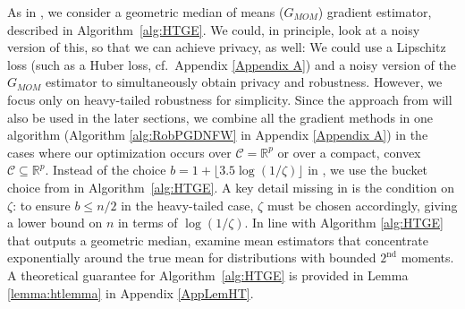\documentclass{article}
\newtheorem{definition}{Definition}[section]
\newcommand{\iid}{i.i.d.{\ }}
\begin{document}



As in \cite{RE}, we consider a geometric median of means ($G_{MOM}$) gradient estimator, described in Algorithm~\ref{alg:HTGE}. We could, in principle, look at a noisy version of this, so that we can achieve privacy, as well:
We could use a Lipschitz loss (such as a Huber loss, cf.\ Appendix \ref{Appendix A}) and a noisy version of the $G_{MOM}$ estimator to simultaneously obtain privacy and robustness. However, we focus only on heavy-tailed robustness for simplicity. Since the approach from \cite{RE} will also be used in the later sections, we combine all the gradient methods in one algorithm (Algorithm \ref{alg:RobPGDNFW} in Appendix \ref{Appendix A}) in the cases where our optimization occurs over $\mathcal{C} = \mathbb{R}^p$ or over a compact, convex $\mathcal{C} \subseteq \mathbb{R}^p$.
Instead of the choice $b = 1 + \lfloor 3.5 \log(1/\zeta)\rfloor$ in \cite{RE}, we use the bucket choice from \cite{Minsker} in Algorithm~\ref{alg:HTGE}. A key detail missing in \cite{RE} is the condition on $\zeta$: to ensure $b \leq n/2$ in the heavy-tailed case, $\zeta$ must be chosen accordingly, giving a lower bound on $n$ in terms of $\log(1/\zeta)$. In line with Algorithm \ref{alg:HTGE} that outputs a geometric median, \cite{Lera} examine mean estimators that concentrate exponentially around the true mean for distributions with bounded $2^{\text{nd}}$ moments. 
A theoretical guarantee for Algorithm~\ref{alg:HTGE} is provided in Lemma \ref{lemma:htlemma} in Appendix \ref{AppLemHT}.
\end{document}
